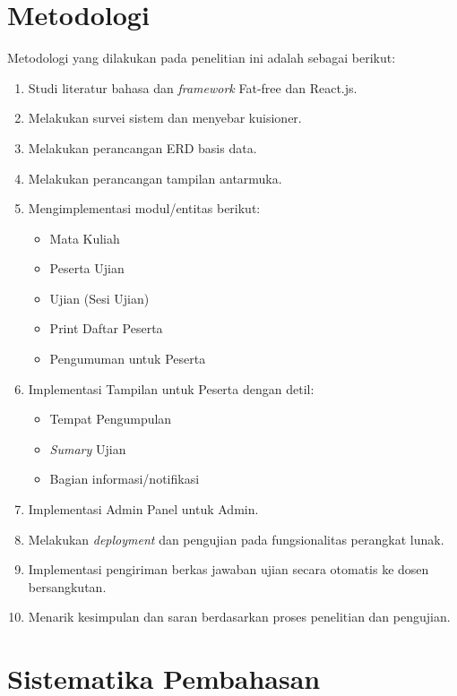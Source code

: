 \section{Metodologi}
Metodologi yang dilakukan pada penelitian ini adalah sebagai berikut:
\label{sec:metlit}
    \begin{enumerate}
        \item Studi literatur bahasa dan \textit{framework} Fat-free dan React.js.
        \item Melakukan survei sistem dan menyebar kuisioner.
		\item Melakukan perancangan ERD basis data.
		\item Melakukan perancangan tampilan antarmuka.
		\item Mengimplementasi modul/entitas berikut:
		    \begin{itemize}
		        \item Mata Kuliah
		        \item Peserta Ujian
		        \item Ujian (Sesi Ujian)
		        \item Print Daftar Peserta
		        \item Pengumuman untuk Peserta
		    \end{itemize}
	     \item Implementasi Tampilan untuk Peserta dengan detil:
		    \begin{itemize}
		        \item Tempat Pengumpulan
		        \item \textit{Sumary} Ujian
		        \item Bagian informasi/notifikasi
		    \end{itemize}
		\item Implementasi Admin Panel untuk Admin.
	    \item Melakukan \textit{deployment} dan pengujian pada fungsionalitas perangkat lunak.
	    \item Implementasi pengiriman berkas jawaban ujian secara otomatis ke dosen bersangkutan.
        \item Menarik kesimpulan dan saran berdasarkan proses penelitian dan pengujian.
    \end{enumerate}

\section{Sistematika Pembahasan}
\label{sec:sispem}

